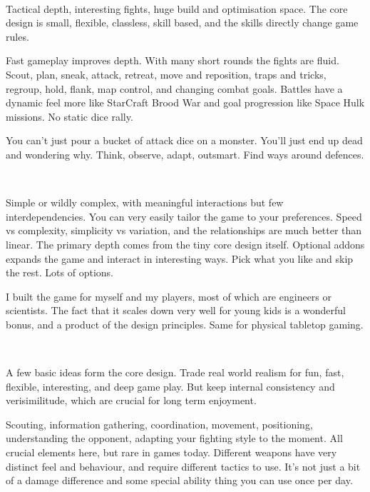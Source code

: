 \

\noindent
Tactical depth, interesting fights, huge build and optimisation space. The core design is small, flexible, classless, skill based, and the skills directly change game rules.

Fast gameplay improves depth. With many short rounds the fights are fluid. Scout, plan, sneak, attack, retreat, move and reposition, traps and tricks, regroup, hold, flank, map control, and changing combat goals. 
Battles have a dynamic feel more like StarCraft Brood War and goal progression like Space Hulk missions. No static dice rally.

You can't just pour a bucket of attack dice on a monster. You'll just end up dead and wondering why. Think, observe, adapt, outsmart. Find ways around defences.

\

\noindent
Simple or wildly complex, with meaningful interactions but few interdependencies. You can very easily tailor the game to your preferences. Speed vs complexity, simplicity vs variation, and the relationships are much better than linear. The primary depth comes from the tiny core design itself. Optional addons expands the game and interact in interesting ways. Pick what you like and skip the rest. Lots of options.

I built the game for myself and my players, most of which are engineers or scientists. The fact that it scales down very well for young kids is a wonderful bonus, and a product of the design principles. Same for physical tabletop gaming.

\

\noindent
A few basic ideas form the core design. Trade real world realism for fun, fast, flexible, interesting, and deep game play. But keep internal consistency and verisimilitude, which are crucial for long term enjoyment.

Scouting, information gathering, coordination, movement, positioning, understanding the opponent, adapting your fighting style to the moment. All crucial elements here, but rare in games today. Different weapons have very distinct feel and behaviour, and require different tactics to use. It's not just a bit of a damage difference and some special ability thing you can use once per day. 





\vfill

